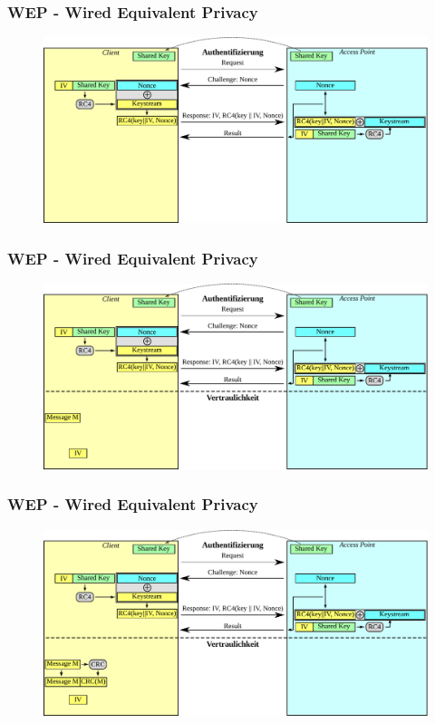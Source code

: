 \documentclass{beamer}
\begin{document}
\begin{frame}
\frametitle{WEP - Wired Equivalent Privacy}
\begin{figure}
	\includegraphics[width=1.0\linewidth]{figures/WEP_auth_9.pdf}
\end{figure}
\end{frame}

\begin{frame}
\frametitle{WEP - Wired Equivalent Privacy}
\begin{figure}
	\includegraphics[width=1.0\linewidth]{figures/WEP_privacy_1.pdf}
\end{figure}
\end{frame}

\begin{frame}
\frametitle{WEP - Wired Equivalent Privacy}
\begin{figure}
	\includegraphics[width=1.0\linewidth]{figures/WEP_privacy_2.pdf}
\end{figure}
\end{frame}
\end{document}
